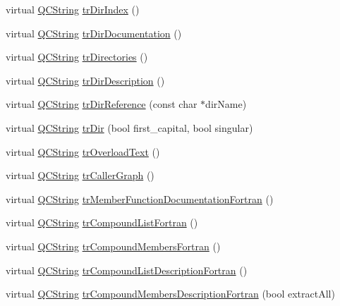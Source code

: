 \begin{DoxyCompactItemize}
\item 
virtual \hyperlink{class_q_c_string}{Q\-C\-String} \hyperlink{class_translator_dutch_ae9895001e5d8629fd068895b2ffa653f}{tr\-Dir\-Index} ()
\item 
virtual \hyperlink{class_q_c_string}{Q\-C\-String} \hyperlink{class_translator_dutch_a89a223d69d1255271719c256b2fd451b}{tr\-Dir\-Documentation} ()
\item 
virtual \hyperlink{class_q_c_string}{Q\-C\-String} \hyperlink{class_translator_dutch_ab7610b46aedb923a1524272dfbaeab38}{tr\-Directories} ()
\item 
virtual \hyperlink{class_q_c_string}{Q\-C\-String} \hyperlink{class_translator_dutch_abf769d2a217fcf6b9d3b9170fbbae7c8}{tr\-Dir\-Description} ()
\item 
virtual \hyperlink{class_q_c_string}{Q\-C\-String} \hyperlink{class_translator_dutch_ae680136bec0ce1d29a1e4e00d871797f}{tr\-Dir\-Reference} (const char $\ast$dir\-Name)
\item 
virtual \hyperlink{class_q_c_string}{Q\-C\-String} \hyperlink{class_translator_dutch_abb2b35bd374b96530198bf061054c951}{tr\-Dir} (bool first\-\_\-capital, bool singular)
\item 
virtual \hyperlink{class_q_c_string}{Q\-C\-String} \hyperlink{class_translator_dutch_ac5436cb286c48cd540d0cdce200a82b9}{tr\-Overload\-Text} ()
\item 
virtual \hyperlink{class_q_c_string}{Q\-C\-String} \hyperlink{class_translator_dutch_ae1d7d38cc426cd25124b1658b1125841}{tr\-Caller\-Graph} ()
\item 
virtual \hyperlink{class_q_c_string}{Q\-C\-String} \hyperlink{class_translator_dutch_a006270b30df57f83fe40ad0ed617652e}{tr\-Member\-Function\-Documentation\-Fortran} ()
\item 
virtual \hyperlink{class_q_c_string}{Q\-C\-String} \hyperlink{class_translator_dutch_a17985bd956c4940e53e169cadb659c2b}{tr\-Compound\-List\-Fortran} ()
\item 
virtual \hyperlink{class_q_c_string}{Q\-C\-String} \hyperlink{class_translator_dutch_add44aa8baf655554ec74dbfac0d43f71}{tr\-Compound\-Members\-Fortran} ()
\item 
virtual \hyperlink{class_q_c_string}{Q\-C\-String} \hyperlink{class_translator_dutch_a10aa72b35051f95ba30f2b0312ce705c}{tr\-Compound\-List\-Description\-Fortran} ()
\item 
virtual \hyperlink{class_q_c_string}{Q\-C\-String} \hyperlink{class_translator_dutch_a0c98da65b5772e9c2876855a42d44127}{tr\-Compound\-Members\-Description\-Fortran} (bool extract\-All)

\end{DoxyCompactItemize}
